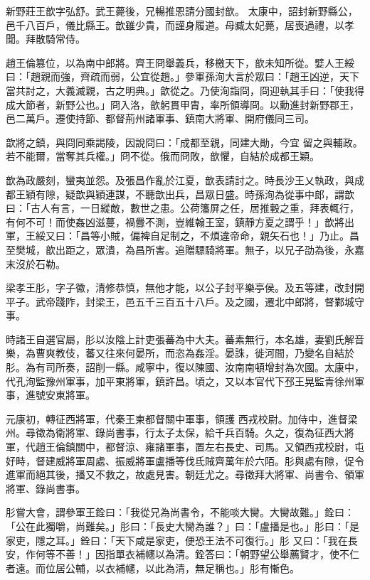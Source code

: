 \begin{pinyinscope}
 新野莊王歆字弘舒。武王薨後，兄暢推恩請分國封歆。
 太康中，詔封新野縣公，邑千八百戶，儀比縣王。歆雖少貴，而謹身履道。母臧太妃薨，居喪過禮，以孝聞。拜散騎常侍。



 趙王倫篡位，以為南中郎將。齊王冏舉義兵，移檄天下，歆未知所從。嬖人王綏曰：「趙親而強，齊疏而弱，公宜從趙。」參軍孫洵大言於眾曰：「趙王凶逆，天下當共討之，大義滅親，古之明典。」歆從之。乃使洵詣冏，冏迎執其手曰：「使我得成大節者，新野公也。」冏入洛，歆躬貫甲胄，率所領導冏。以勳進封新野郡王，邑二萬戶。遷使持節、都督荊州諸軍事、鎮南大將軍、開府儀同三司。



 歆將之鎮，與冏同乘謁陵，因說冏曰：「成都至親，同建大勛，今宜
 留之與輔政。若不能爾，當奪其兵權。」冏不從。俄而冏敗，歆懼，自結於成都王穎。



 歆為政嚴刻，蠻夷並怨。及張昌作亂於江夏，歆表請討之。時長沙王乂執政，與成都王穎有隙，疑歆與穎連謀，不聽歆出兵，昌眾日盛。時孫洵為從事中郎，謂歆曰：「古人有言，一日縱敵，數世之患。公荷籓屏之任，居推轂之重，拜表輒行，有何不可！而使姦凶滋蔓，禍釁不測，豈維翰王室，鎮靜方夏之謂乎！」歆將出軍，王綏又曰：「昌等小賊，偏裨自足制之，不煩違帝命，親矢石也！」乃止。昌至樊城，歆出距之，眾潰，為昌所害。追贈驃騎將軍。無子，以兄子劭為後，永嘉末沒於石勒。



 梁孝王肜，字子徽，清修恭慎，無他才能，以公子封平樂亭侯。及五等建，改封開平子。武帝踐阼，封梁王，邑五千三百五十八戶。及之國，遷北中郎將，督鄴城守事。



 時諸王自選官屬，肜以汝陰上計吏張蕃為中大夫。蕃素無行，本名雄，妻劉氏解音樂，為曹爽教伎，蕃又往來何晏所，而恣為姦淫。晏誅，徙河間，乃變名自結於肜。為有司所奏，詔削一縣。咸寧中，復以陳國、汝南南頓增封為次國。太康中，代孔洵監豫州軍事，加平東將軍，鎮許昌。頃之，又以本官代下邳王晃監青徐州軍事，進號安東將軍。



 元康初，轉征西將軍，代秦王柬都督關中軍事，領護
 西戎校尉。加侍中，進督梁州。尋徵為衛將軍、錄尚書事，行太子太保，給千兵百騎。久之，復為征西大將軍，代趙王倫鎮關中，都督涼、雍諸軍事，置左右長史、司馬。又領西戎校尉，屯好畤，督建威將軍周處、振威將軍盧播等伐氐賊齊萬年於六陌。肜與處有隙，促令進軍而絕其後，播又不救之，故處見害。朝廷尤之。尋徵拜大將軍、尚書令、領軍將軍、錄尚書事。



 肜嘗大會，謂參軍王銓曰：「我從兄為尚書令，不能啖大臠。大臠故難。」銓曰：「公在此獨嚼，尚難矣。」肜曰：「長史大臠為誰？」曰：「盧播是也。」肜曰：「是家吏，隱之耳。」銓曰：「天下咸是家吏，便恐王法不可復行。」肜
 又曰：「我在長安，作何等不善！」因指單衣補幰以為清。銓答曰：「朝野望公舉薦賢才，使不仁者遠。而位居公輔，以衣補幰，以此為清，無足稱也。」肜有慚色。




\end{pinyinscope}
